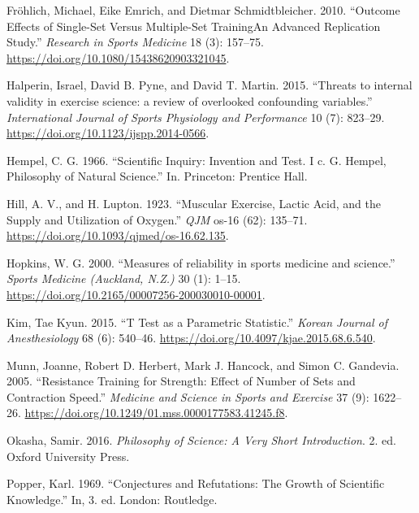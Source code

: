 \documentclass[
]{book}
\newlength{\cslhangindent}
\newlength{\cslentryspacingunit} %
\newenvironment{CSLReferences}[2] %
 {%
  \setlength{\parindent}{0pt}
  \ifodd #1
  \let\oldpar\par
  \def\par{\hangindent=\cslhangindent\oldpar}
  \fi
  \setlength{\parskip}{#2\cslentryspacingunit}
 }%
 {}
\begin{document}
\begin{CSLReferences}{1}{0}
\leavevmode{}%
Fröhlich, Michael, Eike Emrich, and Dietmar Schmidtbleicher. 2010.
{``Outcome Effects of Single-Set Versus Multiple-Set
Training{\textemdash}An Advanced Replication Study.''} \emph{Research in
Sports Medicine} 18 (3): 157--75.
\url{https://doi.org/10.1080/15438620903321045}.

\leavevmode{}%
Halperin, Israel, David B. Pyne, and David T. Martin. 2015. {``Threats
to internal validity in exercise science: a review of overlooked
confounding variables.''} \emph{International Journal of Sports
Physiology and Performance} 10 (7): 823--29.
\url{https://doi.org/10.1123/ijspp.2014-0566}.

\leavevmode{}%
Hempel, C. G. 1966. {``Scientific Inquiry: Invention and Test. I c. G.
Hempel, Philosophy of Natural Science.''} In. Princeton: Prentice Hall.

\leavevmode{}%
Hill, A. V., and H. Lupton. 1923. {``Muscular Exercise, Lactic Acid, and
the Supply and Utilization of Oxygen.''} \emph{QJM} os-16 (62): 135--71.
\url{https://doi.org/10.1093/qjmed/os-16.62.135}.

\leavevmode{}%
Hopkins, W. G. 2000. {``Measures of reliability in sports medicine and
science.''} \emph{Sports Medicine (Auckland, N.Z.)} 30 (1): 1--15.
\url{https://doi.org/10.2165/00007256-200030010-00001}.

\leavevmode{}%
Kim, Tae Kyun. 2015. {``T Test as a Parametric Statistic.''}
\emph{Korean Journal of Anesthesiology} 68 (6): 540--46.
\url{https://doi.org/10.4097/kjae.2015.68.6.540}.

\leavevmode{}%
Munn, Joanne, Robert D. Herbert, Mark J. Hancock, and Simon C. Gandevia.
2005. {``Resistance Training for Strength: Effect of Number of Sets and
Contraction Speed.''} \emph{Medicine and Science in Sports and Exercise}
37 (9): 1622--26.
\url{https://doi.org/10.1249/01.mss.0000177583.41245.f8}.

\leavevmode{}%
Okasha, Samir. 2016. \emph{Philosophy of Science: A Very Short
Introduction}. 2. ed. Oxford University Press.

\leavevmode{}%
Popper, Karl. 1969. {``Conjectures and Refutations: The Growth of
Scientific Knowledge.''} In, 3. ed. London: Routledge.


\end{CSLReferences}
\end{document}
